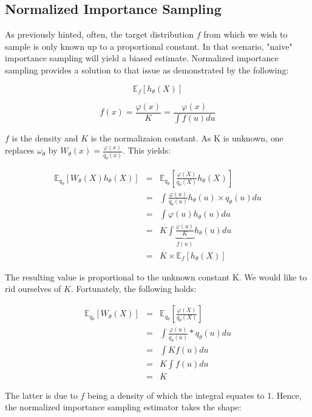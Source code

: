 \subsection{Normalized Importance Sampling}


As previously hinted, often, the target distribution $f$ from which we wish to sample is only known up to a proportional constant. In that scenario, "naive" importance sampling will yield a biased estimate. Normalized importance sampling provides a solution to that issue as demonstrated by the following: 

$$\mathbb E_f \left[ h_\theta(X) \right]$$

$$f(x) = \frac{\varphi(x)}{K} = \frac{\varphi(x)}{ \int f(u) du}$$

$f$ is the density and $K$ is the normalizaion constant. As K is unknown, one replaces $\omega_\theta$ by $W_\theta(x) = \frac{\varphi(x)}{q_\theta(x)}$. 
This yields:

$$
\begin{array}{rcl}
\mathbb E_{q_\theta}\left[ W_\theta(X) h_\theta(X) \right] &=& \mathbb E_{q_\theta}\left[ \frac{\varphi(X)}{q_\theta(X)} h_\theta(X) \right]
\\
&=& \displaystyle\int \frac{\varphi(u)}{q_\theta(u)} h_\theta(u) \times q_\theta(u) du
\\
&=& \displaystyle\int \varphi(u) h_\theta(u)du
\\
&=& K \displaystyle\int \underbrace{\frac{\varphi(u)} K}_{f(u)} h_\theta(u)du
\\
&=& K \times \mathbb E_{f}\left[ h_\theta(X) \right]
\end{array}$$

The resulting value is proportional to the unknown constant K. We would like to rid ourselves of $K$. Fortunately, the following holds:

$$
\begin{array}{rcl}
\mathbb E_{q_\theta}\left[ W_\theta(X) \right] 
&=& \mathbb E_{q_\theta}\left[ \frac{\varphi(X)}{q_\theta(X)} \right]
\\
&=&
\displaystyle \int \frac{\varphi(u)}{q_\theta(u)} * q_\theta(u) du 
\\
&=&
\displaystyle\int K f(u) du 
\\
&=& K \displaystyle\int f(u) du 
\\
&=& K
\end{array}
$$

The latter is due to $f$ being a density of which the integral equates to 1. Hence, the normalized importance sampling estimator takes the shape: 

